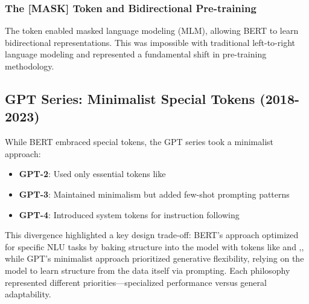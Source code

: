 \subsubsection{The [MASK] Token and Bidirectional Pre-training}
The \mask{} token enabled masked language modeling (MLM), allowing BERT to learn bidirectional representations. This was impossible with traditional left-to-right language modeling and represented a fundamental shift in pre-training methodology.

\subsection{GPT Series: Minimalist Special Tokens (2018-2023)}

While BERT embraced special tokens, the GPT series \citep{radford2019language} took a minimalist approach:

\begin{itemize}
\item \textbf{GPT-2}: Used only essential tokens like 
\item \textbf{GPT-3}: Maintained minimalism but added few-shot prompting patterns
\item \textbf{GPT-4}: Introduced system tokens for instruction following
\end{itemize}

This divergence highlighted a key design trade-off: BERT's approach optimized for specific NLU tasks by baking structure into the model with tokens like \cls{} and \sep{}, while GPT's minimalist approach prioritized generative flexibility, relying on the model to learn structure from the data itself via prompting. Each philosophy represented different priorities---specialized performance versus general adaptability.

